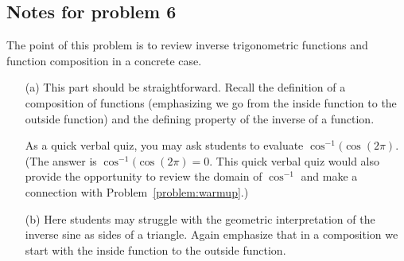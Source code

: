 \documentclass[nooutcomes]{ximera}
\begin{document}
\subsection*{Notes for problem 6}
The point of this problem is to review inverse trigonometric functions and function composition in a concrete case.
\begin{itemize}
  \item[(a)]
    This part should be straightforward.
    Recall the definition of a composition of functions (emphasizing we go from the inside function to the outside function) and the defining property of the inverse of a function.

    As a quick verbal quiz, you may ask students to evaluate $\cos^{-1}(\cos(2\pi)$.
    (The answer is $\cos^{-1}(\cos(2\pi) = 0$.
    This quick verbal quiz would also provide the opportunity to review the domain of $\cos^{-1}$ and make a connection with Problem~\ref{problem:warmup}.)

  \item[(b)]
    Here students may struggle with the geometric interpretation of the inverse sine as sides of a triangle.
    Again emphasize that in a composition we start with the inside function to the outside function.
\end{itemize}
\end{document}
